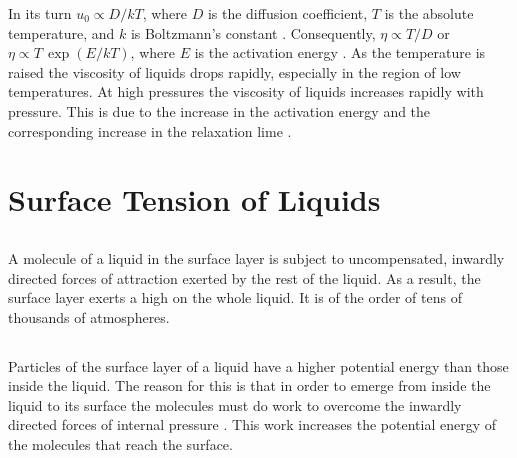 In its turn $u_{0} \propto D/kT$, where $D$ is the diffusion coefficient, $T$ is the absolute temperature, and $k$ is Boltzmann's constant . Consequently, $\eta \propto T/D$ or $\eta \propto T \, \exp (E/kT)$, where $E$ is the activation energy . As the temperature is raised the viscosity of liquids drops rapidly, especially in the region of low temperatures. At high pressures the viscosity of liquids increases rapidly with pressure. This is due to the increase in the activation energy  and the corresponding increase in the relaxation lime .

\section{Surface Tension of Liquids}
\label{sec-13.4}

\subsection{}\label{13.4.1} A molecule of a liquid in the surface layer is subject to uncompensated, inwardly directed forces of attraction exerted by the rest of the liquid. As a result, the surface layer exerts a high  on the whole liquid. It is of the order of tens of thousands of atmospheres.

\subsection{}\label{13.4.2} Particles of the surface layer of a liquid have a higher potential energy than those inside the liquid. The reason for this is that in order to emerge from inside the liquid to its surface the molecules must do work to overcome the inwardly directed forces of internal pressure . This work increases the potential energy of the molecules that reach the surface. 


